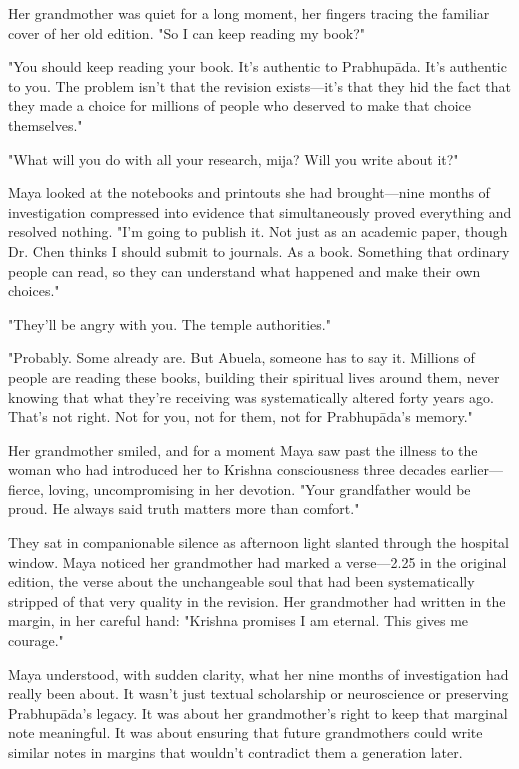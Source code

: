 \documentclass[12pt,twoside]{book}
\begin{document}
Her grandmother was quiet for a long moment, her fingers tracing the familiar cover of her old edition. "So I can keep reading my book?"

"You should keep reading your book. It's authentic to Prabhupāda. It's authentic to you. The problem isn't that the revision exists—it's that they hid the fact that they made a choice for millions of people who deserved to make that choice themselves."

"What will you do with all your research, mija? Will you write about it?"

Maya looked at the notebooks and printouts she had brought—nine months of investigation compressed into evidence that simultaneously proved everything and resolved nothing. "I'm going to publish it. Not just as an academic paper, though Dr. Chen thinks I should submit to journals. As a book. Something that ordinary people can read, so they can understand what happened and make their own choices."

"They'll be angry with you. The temple authorities."

"Probably. Some already are. But Abuela, someone has to say it. Millions of people are reading these books, building their spiritual lives around them, never knowing that what they're receiving was systematically altered forty years ago. That's not right. Not for you, not for them, not for Prabhupāda's memory."

Her grandmother smiled, and for a moment Maya saw past the illness to the woman who had introduced her to Krishna consciousness three decades earlier—fierce, loving, uncompromising in her devotion. "Your grandfather would be proud. He always said truth matters more than comfort."

They sat in companionable silence as afternoon light slanted through the hospital window. Maya noticed her grandmother had marked a verse—2.25 in the original edition, the verse about the unchangeable soul that had been systematically stripped of that very quality in the revision. Her grandmother had written in the margin, in her careful hand: "Krishna promises I am eternal. This gives me courage."

Maya understood, with sudden clarity, what her nine months of investigation had really been about. It wasn't just textual scholarship or neuroscience or preserving Prabhupāda's legacy. It was about her grandmother's right to keep that marginal note meaningful. It was about ensuring that future grandmothers could write similar notes in margins that wouldn't contradict them a generation later.
\end{document}
